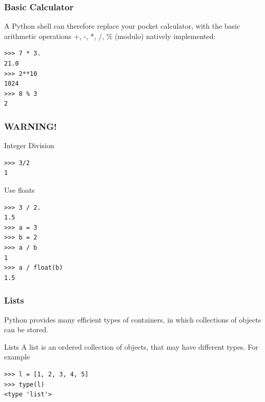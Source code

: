 \documentclass[colorlinks]{beamer}
\begin{document}
\begin{frame}[fragile]\frametitle{Basic Calculator}
\begin{block}{A Python shell can therefore replace your pocket calculator, with the basic arithmetic operations +, -, *, /, \% (modulo) natively implemented:}
\begin{verbatim}
>>> 7 * 3.
21.0
>>> 2**10
1024
>>> 8 % 3
2
\end{verbatim}

\end{block}

\end{frame}
\begin{frame}[fragile]\frametitle{WARNING!}
\begin{block}{Integer Division}
\small
\begin{verbatim}
>>> 3/2
1
\end{verbatim}

\end{block}
\begin{block}{Use floats}
\tiny
\begin{verbatim}
>>> 3 / 2.
1.5
>>> a = 3
>>> b = 2
>>> a / b
1
>>> a / float(b)
1.5
\end{verbatim}

\end{block}
\end{frame}
\begin{frame}[fragile]\frametitle{Lists}
Python provides many efficient types of containers, in which collections of objects can be stored.
\begin{block}{Lists}
A list is an ordered collection of objects, that may have different types. For example
\begin{verbatim}
>>> l = [1, 2, 3, 4, 5]
>>> type(l)
<type 'list'>
\end{verbatim}

\end{block}
\end{frame}
\end{document}
